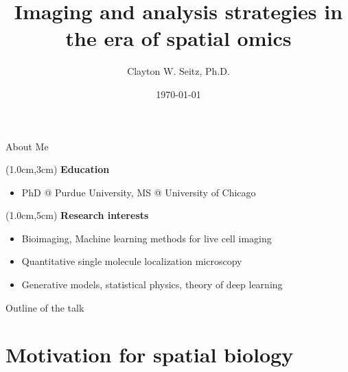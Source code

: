 \documentclass{beamer}					%
\title{Imaging and analysis strategies in the era of spatial omics}	%
\author{Clayton W. Seitz, Ph.D.}								%
\date{\today}									%
\begin{document}
\begin{frame}
  \titlepage
\end{frame}

\begin{frame}{About Me}

\begin{textblock*}{10cm}(1.0cm,3cm)
\textbf{Education}
\begin{itemize}
\item PhD @ Purdue University, MS @ University of Chicago
\end{itemize}
\end{textblock*}

\begin{textblock*}{10cm}(1.0cm,5cm)
\textbf{Research interests}
\begin{itemize}
\item Bioimaging, Machine learning methods for live cell imaging
\item Quantitative single molecule localization microscopy 
\item Generative models, statistical physics, theory of deep learning
\end{itemize}
\end{textblock*}

\end{frame}

\begin{frame}{Outline of the talk}
    \tableofcontents
\end{frame}



%



\section{Motivation for spatial biology}
\end{document}
